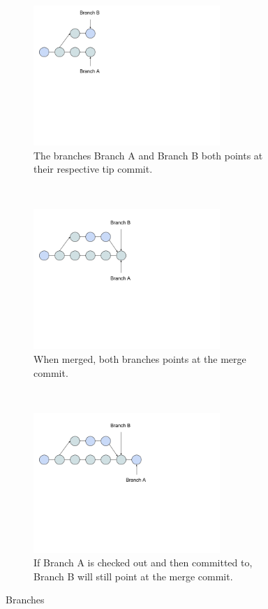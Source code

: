 \begin{figure}
    \centering
    \begin{subfigure}[b]{0.3\textwidth}
        \includegraphics[width=200pt]{figure/branch1.png}
        \caption{The branches Branch A and Branch B both points at their respective tip commit.}
        \label{fig:branch1}
    \end{subfigure}
    ~ %
    \begin{subfigure}[b]{0.3\textwidth}
        \includegraphics[width=200pt]{figure/branch2.png}
        \caption{When merged, both branches points at the merge commit.}
        \label{fig:branch2}
    \end{subfigure}
    ~ %
    \begin{subfigure}[b]{0.3\textwidth}
        \includegraphics[width=200pt]{figure/branch3.png}
        \caption{If Branch A is checked out and then committed to, Branch B will still point at the merge commit.}
        \label{fig:branch3}
    \end{subfigure}
    \caption{Branches}\label{fig:branches}
\end{figure}
